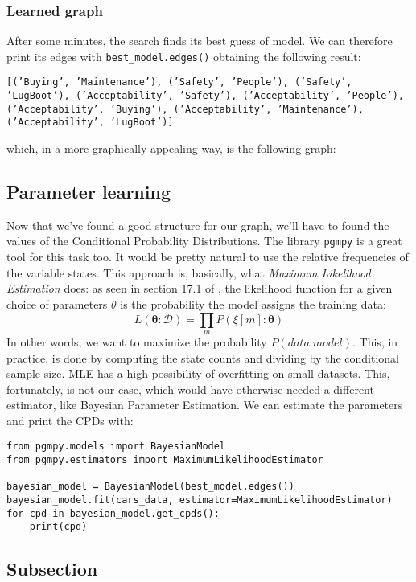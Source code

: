 \subsubsection{Learned graph}
After some minutes, the search finds its best guess of model. We can therefore print its edges with \texttt{best\_model.edges()} obtaining the following result:
\begin{center}
\texttt{[('Buying', 'Maintenance'), ('Safety', 'People'), ('Safety', 'LugBoot'), ('Acceptability', 'Safety'), ('Acceptability', 'People'), ('Acceptability', 'Buying'), ('Acceptability', 'Maintenance'), ('Acceptability', 'LugBoot')]}
\end{center}
which, in a more graphically appealing way, is the following graph:
\subsection{Parameter learning}
Now that we've found a good structure for our graph, we'll have to found the values of the Conditional Probability Distributions. The library \texttt{pgmpy} is a great tool for this task too. It would be pretty natural to use the relative frequencies of the variable states. This approach is, basically, what \textit{Maximum Likelihood Estimation} does: as seen in section 17.1 of \cite{book:probgraphmod}, the likelihood function for a given choice of parameters $\theta$ is the probability the model assigns the training data:
\begin{equation}
L(\boldsymbol{\theta}: \mathcal{D})=\prod_{m} P(\xi[m]: \boldsymbol{\theta})
\end{equation}
In other words, we want to maximize the probability $P(data|model)$. This, in practice, is done by computing the state counts and dividing by the conditional sample size.
MLE has a high possibility of overfitting on small datasets. This, fortunately, is not our case, which would have otherwise needed a different estimator, like Bayesian Parameter Estimation. We can estimate the parameters and print the CPDs with:
\begin{verbatim}
from pgmpy.models import BayesianModel
from pgmpy.estimators import MaximumLikelihoodEstimator

bayesian_model = BayesianModel(best_model.edges())
bayesian_model.fit(cars_data, estimator=MaximumLikelihoodEstimator)
for cpd in bayesian_model.get_cpds():
    print(cpd)
\end{verbatim}

\subsection{Subsection}
\lipsum[8]
\lipsum[8]